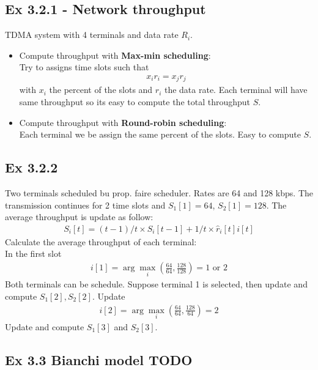 \subsection*{Ex 3.2.1 - Network throughput}
TDMA system with 4 terminals and data rate $R_i$.
\begin{itemize}
	\item Compute throughput with \textbf{Max-min scheduling}:\\
	Try to assigns time slots such that 
	\begin{align*}
		x_i r_i = x_j r_j
	\end{align*}
	with $x_i$ the percent of the slots and $r_i$ the data rate. Each terminal will have same throughput so its easy to compute the total throughput $S$.

	\item Compute throughput with \textbf{Round-robin scheduling}:\\
	Each terminal we be assign the same percent of the slots. Easy to compute $S$.
\end{itemize}

\subsection*{Ex 3.2.2}
Two terminals scheduled bu prop. faire scheduler. Rates are 64 and 128 kbps. The transmission continues for 2 time slots and $S_1[1] = 64$, $S_2[1] = 128$. The average throughput is update as follow:
\begin{align*}
	S_i[t] = (t-1)/t \times S_i[t-1] + 1/t \times \hat{r}_i[t] i[t]
\end{align*}
Calculate the average throughput of each terminal:\\
In the first slot
\begin{align*}
	i[1] = \arg \max_i(\frac{64}{64}, \frac{128}{128}) = 1 \text{ or } 2
\end{align*}
Both terminals can be schedule. Suppose terminal 1 is selected, then update and compute $S_1[2], S_2[2]$. Update 
\begin{align*}
	i[2] = \arg \max_i(\frac{64}{64}, \frac{128}{64}) = 2
\end{align*}
Update and compute $S_1[3]$ and $S_2[3]$.

\subsection*{Ex 3.3 Bianchi model TODO}



